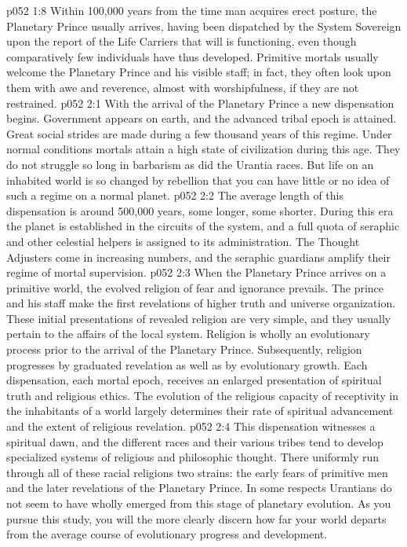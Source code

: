 \vs p052 1:8 \pc Within 100,000 years from the time man acquires erect posture, the Planetary Prince usually arrives, having been dispatched by the System Sovereign upon the report of the Life Carriers that will is functioning, even though comparatively few individuals have thus developed. Primitive mortals usually welcome the Planetary Prince and his visible staff; in fact, they often look upon them with awe and reverence, almost with worshipfulness, if they are not restrained.
\vs p052 2:1 With the arrival of the Planetary Prince a new dispensation begins. Government appears on earth, and the advanced tribal epoch is attained. Great social strides are made during a few thousand years of this regime. Under normal conditions mortals attain a high state of civilization during this age. They do not struggle so long in barbarism as did the Urantia races. But life on an inhabited world is so changed by rebellion that you can have little or no idea of such a regime on a normal planet.
\vs p052 2:2 The average length of this dispensation is around 500,000 years, some longer, some shorter. During this era the planet is established in the circuits of the system, and a full quota of seraphic and other celestial helpers is assigned to its administration. The Thought Adjusters come in increasing numbers, and the seraphic guardians amplify their regime of mortal supervision.
\vs p052 2:3 When the Planetary Prince arrives on a primitive world, the evolved religion of fear and ignorance prevails. The prince and his staff make the first revelations of higher truth and universe organization. These initial presentations of revealed religion are very simple, and they usually pertain to the affairs of the local system. Religion is wholly an evolutionary process prior to the arrival of the Planetary Prince. Subsequently, religion progresses by graduated revelation as well as by evolutionary growth. Each dispensation, each mortal epoch, receives an enlarged presentation of spiritual truth and religious ethics. The evolution of the religious capacity of receptivity in the inhabitants of a world largely determines their rate of spiritual advancement and the extent of religious revelation.
\vs p052 2:4 This dispensation witnesses a spiritual dawn, and the different races and their various tribes tend to develop specialized systems of religious and philosophic thought. There uniformly run through all of these racial religions two strains: the early fears of primitive men and the later revelations of the Planetary Prince. In some respects Urantians do not seem to have wholly emerged from this stage of planetary evolution. As you pursue this study, you will the more clearly discern how far your world departs from the average course of evolutionary progress and development.
